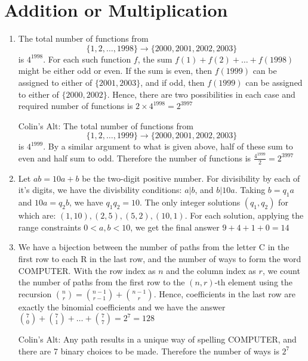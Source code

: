 \documentclass{book}
\numberwithin{equation}{section}
\begin{document}
\chapter{Addition or Multiplication}

\begin{enumerate}[label={1.\arabic*}]

\item
The total number of functions from $$\{1, 2, \dots, 1998\} \to \{2000, 2001,
2002, 2003\}$$ is $4^{1998}$. For each such function $f$, the sum
$f(1)+f(2)+\dots+f(1998)$ might be either odd or even. If the sum is
even, then $f(1999)$ can be assigned to either of $\{2001, 2003\}$, and if
odd, then $f(1999)$ can be assigned to either of $\{2000, 2002\}$. Hence,
there are two possibilities in each case and required number of
functions is $2\times4^{1998}=2^{3997}$

Colin's Alt: The total number of functions from
$$\{1, 2, \dots, 1999\} \to
\{2000, 2001, 2002, 2003\}$$ is $4^{1999}$. By a similar argument to what is
given above, half of these sum to even and half sum to odd. Therefore the
number of functions is $\frac{4^{1999}}{2} = 2^{3997}$

\item
Let $ab=10a+b$ be the two-digit positive number. For divisibility by
each of it's digits, we have the divisbility conditions: $a | b$, and
$b | 10a$. Taking $b=q_1a$ and $10a=q_2b$, we have $q_1q_2=10$. The only
integer solutions $(q_1,q_2)$ for which are:
$(1,10),(2,5),(5,2),(10,1)$. For each solution, applying the range
constraints $0<a,b<10$, we get the final answer $9 + 4 + 1 + 0 = 14$

\item
We have a bijection between the number of paths from the letter C in
the first row to each R in the last row, and the number of ways to
form the word COMPUTER. With the row index as $n$ and the column index
as $r$, we count the number of paths from the first row to the $(n,
r)$-th element using the recursion ${n \choose r} = {{n-1} \choose {r-1}}
+ {{n-1} \choose r}$. Hence, coefficients in the last row are exactly the binomial
coefficients and we have the answer ${7 \choose 0} + {7 \choose 1} + \dots +
{7 \choose 7} = 2^7 = 128$

Colin's Alt: Any path results in a unique way of spelling COMPUTER, and
there are 7 binary choices to be made. Therefore the number of ways is $2^7$


\end{enumerate}
\end{document}
